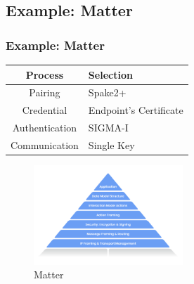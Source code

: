 \documentclass{ctexbeamer}
\begin{document}
\subsection{Example: Matter}
\begin{frame}
    \frametitle{Example: Matter}


    \begin{table}[width=\textwidth]
        \begin{tabular}{ |c|l| } \hline
            \textbf{Process} & \textbf{Selection} \\ \hline
            Pairing & Spake2+  \\ \hline
            Credential & Endpoint's Certificate \\ \hline
            Authentication &  SIGMA-I \\ \hline
            Communication & Single Key \\ \hline
            \end{tabular}
            \end{table}

    \begin{figure}[H]
        \centering 
        \includegraphics[width=0.5\textwidth]{pic/matter.png} 
        \caption{Matter} 
        \label{fig.matter}
    \end{figure}

\end{frame}
\end{document}
